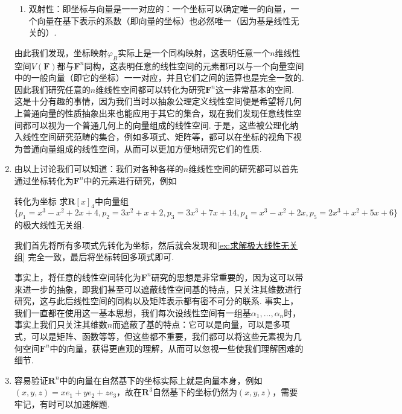 \begin{enumerate}
\begin{enumerate}
              \item 双射性：即坐标与向量是一一对应的：一个坐标可以确定唯一的向量，一个向量在基下表示的系数（即向量的坐标）也必然唯一（因为基是线性无关的）.
          \end{enumerate}
          由此我们发现，坐标映射$\varphi_B$实际上是一个同构映射，这表明任意一个$n$维线性空间$V(\mathbf{F})$都与$\mathbf{F}^n$同构，这表明任意的线性空间的元素都可以与一个向量空间中的一般向量（即它的坐标）一一对应，并且它们之间的运算也是完全一致的. 因此我们研究任意的$n$维线性空间都可以转化为研究$\mathbf{F}^n$这一非常基本的空间. 这是十分有趣的事情，因为我们当时以抽象公理定义线性空间便是希望将几何上普通向量的性质抽象出来也能应用于其它的集合，现在我们发现任意线性空间都可以视为一个普通几何上的向量组成的线性空间. 于是，这些被公理化纳入线性空间研究范畴的集合，例如多项式、矩阵等，都可以在坐标的视角下视为普通向量组成的线性空间，从而可以更加方便地研究它们的性质.

    \item 由以上讨论我们可以知道：我们对各种各样的$n$维线性空间的研究都可以首先通过坐标转化为$\mathbf{F}^n$中的元素进行研究，例如
          \begin{example}{}{转化为坐标}
              求$\mathbf{R}[x]_4$中向量组$\{p_1=x^3-x^2+2x+4,p_2=3x^2+x+2,p_3=3x^3+7x+14,p_4=x^3-x^2+2x,p_5=2x^3+x^2+5x+6\}$的极大线性无关组.
          \end{example}
          \begin{solution}
              我们首先将所有多项式先转化为坐标，然后就会发现和\autoref{ex:求解极大线性无关组} 完全一致，最后将坐标转回多项式即可.
          \end{solution}

          事实上，将任意的线性空间转化为$\mathbf{F}^n$研究的思想是非常重要的，因为这可以带来进一步的抽象，即我们甚至可以遮蔽线性空间基的特点，只关注其维数进行研究，这与此后线性空间的同构以及矩阵表示都有密不可分的联系. 事实上，我们一直都在使用这一基本思想，我们每次设线性空间有一组基$\alpha_1,\ldots,\alpha_n$时，事实上我们只关注其维数$n$而遮蔽了基的特点：它可以是向量，可以是多项式，可以是矩阵、函数等等，但这些都不重要，我们都可以将这些元素视为几何空间$\mathbf{F}^n$中的向量，获得更直观的理解，从而可以忽视一些使我们理解困难的细节.

    \item 容易验证$\mathbf{R}^n$中的向量在自然基下的坐标实际上就是向量本身，例如$(x,y,z)=xe_1+ye_2+ze_3$，故在$\mathbf{R}^3$自然基下的坐标仍然为$(x,y,z)$，需要牢记，有时可以加速解题.
\end{enumerate}

